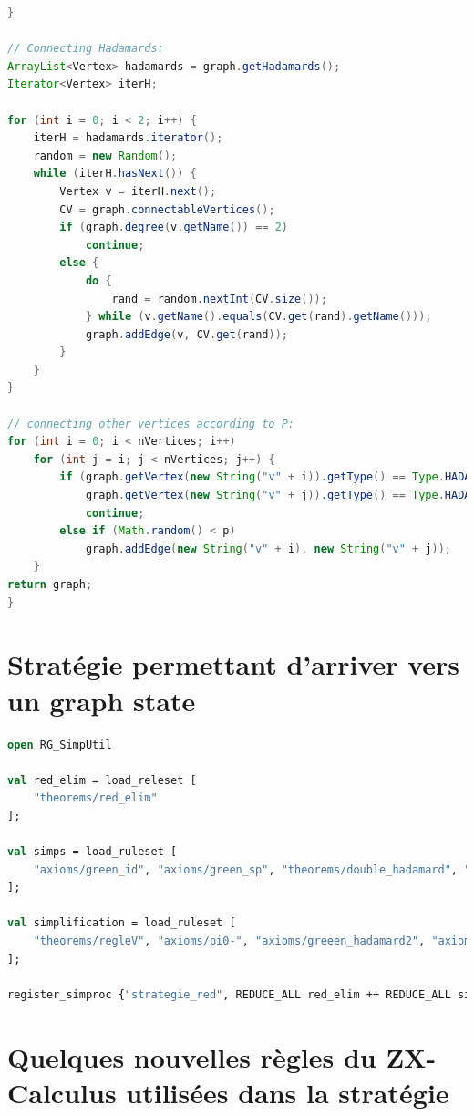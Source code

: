 \documentclass[a4paper,oneside]{book}
\begin{document}
\begin{lstlisting}[language=java]
}

// Connecting Hadamards:
ArrayList<Vertex> hadamards = graph.getHadamards();
Iterator<Vertex> iterH;

for (int i = 0; i < 2; i++) {
	iterH = hadamards.iterator();
	random = new Random();
	while (iterH.hasNext()) {
		Vertex v = iterH.next();
		CV = graph.connectableVertices();
		if (graph.degree(v.getName()) == 2)
			continue;
		else {
			do {
				rand = random.nextInt(CV.size());
			} while (v.getName().equals(CV.get(rand).getName()));
			graph.addEdge(v, CV.get(rand));
		}
	}
}

// connecting other vertices according to P:
for (int i = 0; i < nVertices; i++)
	for (int j = i; j < nVertices; j++) {
		if (graph.getVertex(new String("v" + i)).getType() == Type.HADAMARD ||
			graph.getVertex(new String("v" + j)).getType() == Type.HADAMARD)
			continue;	
		else if (Math.random() < p)
			graph.addEdge(new String("v" + i), new String("v" + j));
	}
return graph;
}
\end{lstlisting}

\chapter{Stratégie permettant d'arriver vers un graph state}
\begin{lstlisting}[frame=single, language=ml]
open RG_SimpUtil

val red_elim = load_releset [
	"theorems/red_elim"
];

val simps = load_ruleset [
	"axioms/green_id", "axioms/green_sp", "theorems/double_hadamard", "theorems/par_hadamard", "axioms/copy"
];

val simplification = load_ruleset [
	"theorems/regleV", "axioms/pi0-", "axioms/greeen_hadamard2", "axioms/3pirgreen"
];

register_simproc {"strategie_red", REDUCE_ALL red_elim ++ REDUCE_ALL simps ++ REDUCE_ALL simplification ++ REDUCE_ALL simps};
\end{lstlisting}

\chapter{Quelques nouvelles règles du ZX-Calculus utilisées dans la stratégie}
\end{document}
